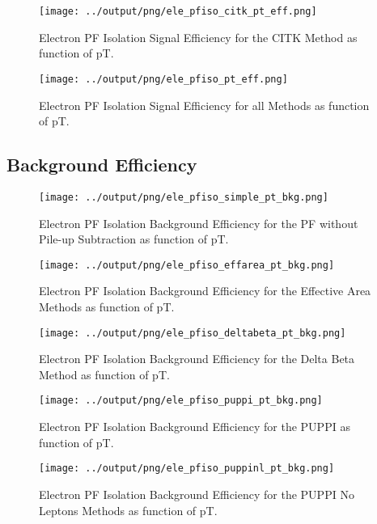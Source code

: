 \documentclass[11pt]{book}
\begin{document}
\begin{figure}[htb]
\centering
\texttt{[image: ../output/png/ele\_pfiso\_citk\_pt\_eff.png]}
\caption{Electron PF Isolation Signal Efficiency for the CITK Method as function of pT.}
\label{fig:ele_pfiso_pt_eff_citk}
\end{figure}

\begin{figure}[htb]
\centering
\texttt{[image: ../output/png/ele\_pfiso\_pt\_eff.png]}
\caption{Electron PF Isolation Signal Efficiency for all Methods as function of pT.}
\label{fig:ele_pfiso_pt_eff}
\end{figure}
\clearpage

\subsection{Background Efficiency}
\begin{figure}[htb]
\centering
\texttt{[image: ../output/png/ele\_pfiso\_simple\_pt\_bkg.png]}
\caption{Electron PF Isolation Background Efficiency for the PF without Pile-up Subtraction as function of pT.}
\label{fig:ele_pfiso_pt_bkg_simple}
\end{figure}

\begin{figure}[htb]
\centering
\texttt{[image: ../output/png/ele\_pfiso\_effarea\_pt\_bkg.png]}
\caption{Electron PF Isolation Background Efficiency for the Effective Area Methods as function of pT.}
\label{fig:ele_pfiso_pt_bkg_effarea}
\end{figure}

\begin{figure}[htb]
\centering
\texttt{[image: ../output/png/ele\_pfiso\_deltabeta\_pt\_bkg.png]}
\caption{Electron PF Isolation Background Efficiency for the Delta Beta Method as function of pT.}
\label{fig:ele_pfiso_pt_bkg_deltabeta}
\end{figure}

\begin{figure}[htb]
\centering
\texttt{[image: ../output/png/ele\_pfiso\_puppi\_pt\_bkg.png]}
\caption{Electron PF Isolation Background Efficiency for the PUPPI as function of pT.}
\label{fig:ele_pfiso_pt_bkg_puppi}
\end{figure}

\begin{figure}[htb]
\centering
\texttt{[image: ../output/png/ele\_pfiso\_puppinl\_pt\_bkg.png]}
\caption{Electron PF Isolation Background Efficiency for the PUPPI No Leptons Methods as function of pT.}
\label{fig:ele_pfiso_pt_bkg_puppinl}
\end{figure}
\end{document}
